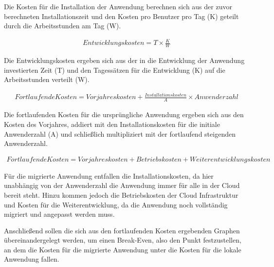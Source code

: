 Die Kosten für die Installation der Anwendung berechnen sich aus der zuvor berechneten Installationszeit und den Kosten pro Benutzer pro Tag (K) geteilt durch die Arbeitsstunden am Tag (W).

\begin{align}
    Entwicklungskosten = T \times \frac{K}{W}
\end{align}

Die Entwicklungskosten ergeben sich aus der in die Entwicklung der Anwendung investierten Zeit (T) und den Tagessätzen für die Entwicklung (K) auf die Arbeitsstunden verteilt (W).

\begin{align}
    Fortlaufende Kosten = Vorjahreskosten + \frac{Installationskosten}{A} \times Anwenderzahl
\end{align}

Die fortlaufenden Kosten für die ursprüngliche Anwendung ergeben sich aus den Kosten des Vorjahres, addiert mit den Installationskosten für die initiale Anwenderzahl (A) und schließlich multipliziert mit der fortlaufend steigenden Anwenderzahl.

\begin{align}
    Fortlaufende Kosten = Vorjahreskosten + Betriebskosten + Weiterentwicklungskosten
\end{align}

Für die migrierte Anwendung entfallen die Installationskosten, da hier unabhängig von der Anwenderzahl die Anwendung immer für alle in der Cloud bereit steht. Hinzu kommen jedoch die Betriebskosten der Cloud Infrastruktur und Kosten für die Weiterentwicklung, da die Anwendung noch vollständig migriert und angepasst werden muss.

Anschließend sollen die sich aus den fortlaufenden Kosten ergebenden Graphen übereinandergelegt werden, um einen Break-Even, also den Punkt festzustellen, an dem die Kosten für die migrierte Anwendung unter die Kosten für die lokale Anwendung fallen.



